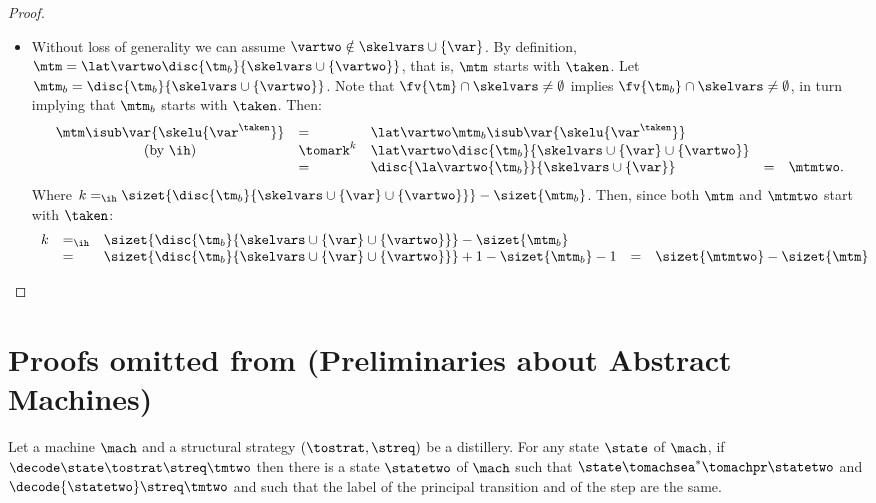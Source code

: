 \begin{proof}
\begin{itemize}
\item {} Without loss of generality we can assume $\vartwo \notin \skelvars \cup \{\var\}$. By definition, $\mtm = \lat\vartwo\disc{\tm_b}{\skelvars \cup \{\vartwo\}}$, that is, $\mtm$ starts with $\taken$. Let $\mtm_b = \disc{\tm_b}{\skelvars \cup \{\vartwo\}}$. Note that $\fv{\tm} \cap \skelvars \neq \emptyset$ implies $\fv{\tm_b} \cap \skelvars \neq \emptyset$, in turn implying that $\mtm_b$ starts with $\taken$. Then:
\[\begin{array}{cllllll}
\mtm\isub\var{\skelu{\var^\taken}} 
&= &
\lat\vartwo\mtm_b\isub\var{\skelu{\var^\taken}}
\\
\mbox{(by \ih)} &\tomark^{k} &
\lat\vartwo\disc{\tm_b}{\skelvars\cup\{\var\}\cup\{\vartwo\}} 
\\
&=&
\disc{\la\vartwo{\tm_b}}{\skelvars\cup\{\var\}} 
&= & \mtmtwo.
\end{array}\]
Where $k =_{\ih} \sizet{\disc{\tm_b}{\skelvars\cup\{\var\}\cup\{\vartwo\}}} - \sizet{\mtm_b}$.
Then, since both $\mtm$ and $\mtmtwo$ start with $\taken$:
\[\begin{array}{cllllll}
k
& =_{\ih} & \sizet{\disc{\tm_b}{\skelvars\cup\{\var\}\cup\{\vartwo\}}} - \sizet{\mtm_b}
\\
& = & 
\sizet{\disc{\tm_b}{\skelvars\cup\{\var\}\cup\{\vartwo\}}} +1 - \sizet{\mtm_b} -1
& = & 
\sizet{\mtmtwo} - \sizet{\mtm}\qedhere
\end{array}\]
\end{itemize}
\end{proof}








\section{Proofs omitted from  (Preliminaries about Abstract Machines)}
\label{sect:app-prel-machines}

\begin{lemma}
  \label{l:one-step-simulation}
  Let a machine $\mach$ and a structural strategy $(\tostrat,\streq)$ be a distillery.
  For any state $\state$ of $\mach$, if $\decode\state \tostrat \streq\tmtwo$ then there is a state $\statetwo$ of $\mach$ such that $\state \tomachsea^*\tomachpr \statetwo$ and $\decode{\statetwo} \streq \tmtwo$ and such that the label of the principal transition and of the step are the same.
\end{lemma}


